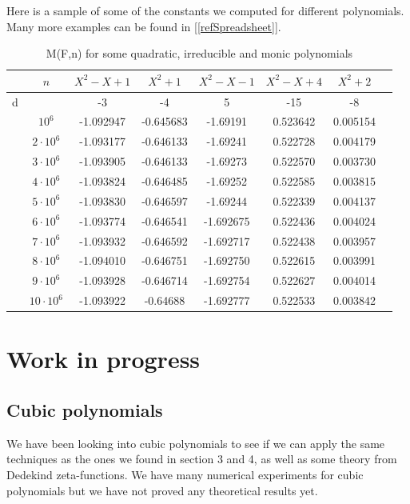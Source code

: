 \documentclass{article}
\theoremstyle{definition}
\theoremstyle{remark}
\begin{document}
Here is a sample of some of the constants we computed for different polynomials. Many more examples can be found in [\ref{refSpreadsheet}].
\begin{table}[H]
\centering
\begin{tabular}{c|c|c|c|c|c|c|c}
	\hline
	 & $n$ & $X^2-X+1$& $X^2+1$ & $X^2-X-1$ & $X^2-X+4$ & $X^2+2$\\
	\hline\hline
	d & & -3 & -4 & 5 & -15 & -8 \\
	\hline
&	$10^6$ & -1.092947 & -0.645683 &-1.69191 & 0.523642 & 0.005154\\
	\hline
&	$2\cdot10^6$ & -1.093177 & -0.646133 &-1.69241 & 0.522728 & 0.004179\\
	\hline
&	$3\cdot10^6$ & -1.093905 & -0.646133 &-1.69273 & 0.522570&  0.003730\\
	\hline
&	$4\cdot10^6$ & -1.093824 & -0.646485 &-1.69252 & 0.522585 & 0.003815\\
	\hline
&	$5\cdot10^6$ & -1.093830 & -0.646597 &-1.69244 & 0.522339 & 0.004137\\
	\hline
&	$6\cdot10^6$ &-1.093774  & -0.646541 &-1.692675 &0.522436 & 0.004024 \\
	\hline
&	$7\cdot10^6$ & -1.093932 & -0.646592 &-1.692717 &0.522438  &0.003957 \\
	\hline
&	$8\cdot10^6$ & -1.094010 & -0.646751 &-1.692750 &0.522615  &0.003991 \\
	\hline
&	$9\cdot10^6$ & -1.093928 & -0.646714 &-1.692754 &0.522627  &0.004014 \\
	\hline
&	$10\cdot10^6$ & -1.093922 & -0.64688 &-1.692777 &0.522533  &0.003842 \\
	\hline
\end{tabular}
\caption{M(F,n) for some quadratic, irreducible and monic polynomials}
\label{M(F) numerically for some polynomials deg2}
\end{table}
\newpage
\section{Work in progress}
\subsection{Cubic polynomials}

We have been looking into cubic polynomials to see if we can apply the same techniques as the ones we found in section 3 and 4, as well as some theory from Dedekind zeta-functions.
We have many numerical experiments for cubic polynomials but we have not proved any theoretical results yet.
\end{document}

